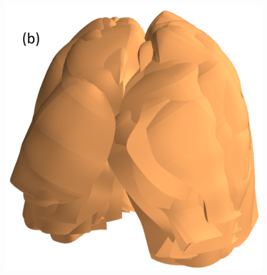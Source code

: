 \documentclass[]{spie}  %
\begin{document}
{\begin{figure}[htbp]
\begin{subfigure}
{\begin{minipage}[t]{0.26\linewidth}
  \includegraphics[width=\linewidth,trim={{.0\wd0} {.0\wd0} {.0\wd0} {.0\wd0}},clip]{Image/ProcrustedMeshes.png}

\end{minipage}}
\end{subfigure}
\end{figure}}
\end{document}
